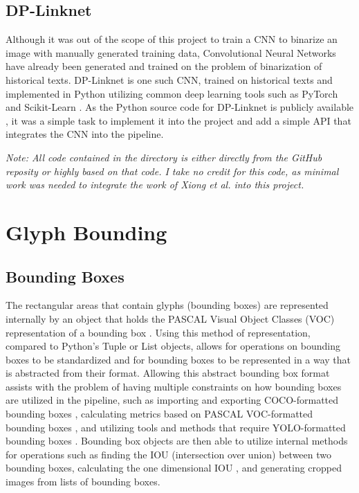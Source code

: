 \subsection{DP-Linknet}

Although it was out of the scope of this project to train a CNN to binarize an image with manually generated training data, Convolutional Neural Networks have already been generated and trained on the problem of binarization of historical texts. DP-Linknet \cite{Xiong} is one such CNN, trained on historical texts and implemented in Python utilizing common deep learning tools such as PyTorch \cite{PyTorch} and Scikit-Learn \cite{Scikit}. As the Python source code for DP-Linknet is publicly available \cite{XiongGit}, it was a simple task to implement it into the project and add a simple API that integrates the CNN into the pipeline.

\textit{Note: All code contained in the}  \textit{ directory is either directly from the GitHub }
\cite{XiongGit}
\textit{ reposity or highly based on that code. I take no credit for this code, as minimal work was needed to integrate the work of Xiong et al. into this project.}

\section{Glyph Bounding}

\subsection{Bounding Boxes}

The rectangular areas that contain glyphs (bounding boxes) are represented internally by an object that holds the PASCAL Visual Object Classes (VOC) representation of a bounding box . Using this method of representation, compared to Python's Tuple or List objects, allows for operations on bounding boxes to be standardized and for bounding boxes to be represented in a way that is abstracted from their format. Allowing this abstract bounding box format assists with the problem of having multiple constraints on how bounding boxes are utilized in the pipeline, such as importing and exporting COCO-formatted bounding boxes , calculating metrics based on PASCAL VOC-formatted bounding boxes , and utilizing tools and methods that require YOLO-formatted bounding boxes . Bounding box objects are then able to utilize internal methods for operations such as finding the IOU (intersection over union)  between two bounding boxes, calculating the one dimensional IOU , and generating cropped images from lists of bounding boxes.

